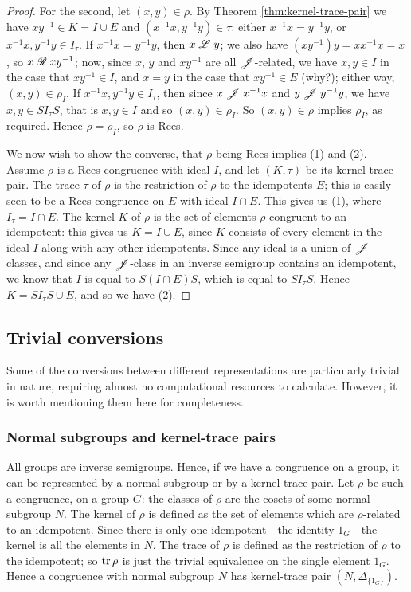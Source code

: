 \begin{theorem}
\begin{proof}
    For the second, let $(x,y) \in \rho$.  By Theorem
    \ref{thm:kernel-trace-pair} we have $xy^{-1} \in K = I \cup E$ and
    $(x^{-1}x, y^{-1}y) \in \tau$: either $x^{-1}x=y^{-1}y$, or
    $x^{-1}x,y^{-1}y \in I_\tau$.  If $x^{-1}x = y^{-1}y$, then $x \mathrel{\mathscr{L}} y$; we
    also have $(xy^{-1})y = xx^{-1}x = x$, so $x \mathrel{\mathscr{R}} xy^{-1}$; now, since $x$,
    $y$ and $xy^{-1}$ are all $\mathrel{\mathscr{J}}$-related, we have $x,y \in I$ in the case
    that $xy^{-1} \in I$, and $x=y$ in the case that $xy^{-1} \in E$ (why?);
    either way, $(x,y) \in \rho_I$.  If $x^{-1}x, y^{-1}y \in I_\tau$, then
    since $x \mathrel{\mathscr{J}} x^{-1}x$ and $y \mathrel{\mathscr{J}} y^{-1}y$, we have $x,y \in SI_\tau S$,
    that is $x,y \in I$ and so $(x,y) \in \rho_I$.  So $(x,y) \in \rho$ implies
    $\rho_I$, as required.  Hence $\rho = \rho_I$, so $\rho$ is Rees.

    We now wish to show the converse, that $\rho$ being Rees implies (1) and
    (2).  Assume $\rho$ is a Rees congruence with ideal $I$, and let $(K,\tau)$
    be its kernel-trace pair.  The trace $\tau$ of $\rho$ is the restriction of
    $\rho$ to the idempotents $E$; this is easily seen to be a Rees congruence
    on $E$ with ideal $I \cap E$.  This gives us (1), where $I_\tau = I \cap E$.
    The kernel $K$ of $\rho$ is the set of elements $\rho$-congruent to an
    idempotent: this gives us $K = I \cup E$, since $K$ consists of every
    element in the ideal $I$ along with any other idempotents.  Since any ideal
    is a union of $\mathrel{\mathscr{J}}$-classes, and since any $\mathrel{\mathscr{J}}$-class in an inverse
    semigroup contains an idempotent, we know that $I$ is equal to
    $S(I \cap E)S$, which is equal to $S I_\tau S$.  Hence
    $K = S I_\tau S \cup E$, and so we have (2).
  \end{proof}
\end{theorem}

\subsection{Trivial conversions}
\label{sec:trivial-conversions}
Some of the conversions between different representations are particularly
trivial in nature, requiring almost no computational resources to calculate.
However, it is worth mentioning them here for completeness.

\subsubsection{Normal subgroups and kernel-trace pairs}
All groups are inverse semigroups.  Hence, if we have a congruence on a group,
it can be represented by a normal subgroup or by a kernel-trace pair.  Let
$\rho$ be such a congruence, on a group $G$: the classes of $\rho$ are the
cosets of some normal subgroup $N$.  The kernel of $\rho$ is defined as the set
of elements which are $\rho$-related to an idempotent.  Since there is only one
idempotent---the identity $1_G$---the kernel is all the elements in $N$.  The
trace of $\rho$ is defined as the restriction of $\rho$ to the idempotent; so
$\operatorname{tr}\rho$ is just the trivial equivalence on the single element $1_G$.  Hence a
congruence with normal subgroup $N$ has kernel-trace pair
$(N, \Delta_{\{1_G\}})$.

